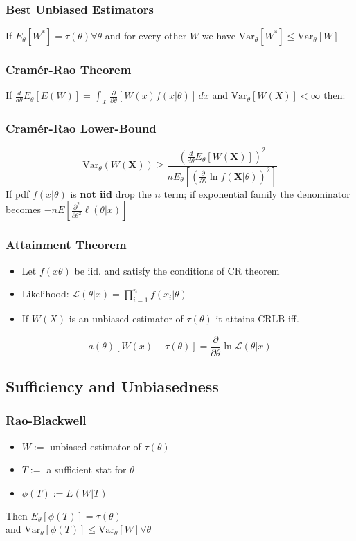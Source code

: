 		\subsubsection{Best Unbiased Estimators}
			If \(E_\theta[W^*] = \tau(\theta) \forall\theta\) 
			and for every other \(W\) we have \(\text{Var}_\theta[W^*]\leq\text{Var}_\theta[W]\)
		
		\subsubsection{Cram\'er-Rao Theorem}
			If 
			\(\frac{d}{d\theta}E_\theta[E(W)] = \int_{\mathcal{X}}\frac{\partial}{\partial\theta}\left[W(x)f(x|\theta)\right]\,dx\)
			and
			\(\text{Var}_\theta[W(X)]<\infty\)
			then:
		
		\subsubsection{Cram\'er-Rao Lower-Bound}
			\[\text{Var}_\theta(W(\mathbf{X}))\geq \frac{\left(\frac{d}{d\theta}E_\theta[W(\mathbf{X})]\right)^2}{
				nE_\theta\left[ \left(\frac{\partial}{\partial\theta}\ln f(\mathbf{X}|\theta)\right)^2 \right]}\]
			If pdf \(f(x|\theta)\) is \textbf{not iid} drop the \(n\) term;
			if exponential family the denominator becomes
			\(-nE\left[\frac{\partial^2}{\partial\theta^2} \ell(\theta|x) \right]\)
			
		\subsubsection{Attainment Theorem}
			\begin{itemize}
				\item Let \(f(x\theta)\) be iid. and satisfy the conditions of CR theorem
				\item Likelihood: \(\mathcal{L}(\theta|x) = \prod_{i=1}^nf(x_i|\theta)\)
				\item If \(W(X)\) is an unbiased estimator of \(\tau(\theta)\) it attains CRLB iff.
			\end{itemize}
			\[a(\theta)\left[W(x)-\tau(\theta)\right] = \frac{\partial}{\partial\theta}\ln\mathcal{L}(\theta|x)\]
			
	\subsection{Sufficiency and Unbiasedness}
		\subsubsection{Rao-Blackwell}
			\begin{itemize}
				\item \(W:=\) unbiased estimator of \(\tau(\theta)\)
				\item \(T:=\) a sufficient stat for \(\theta\)
				\item \(\phi(T):=E(W|T)\)
			\end{itemize}
			Then \(E_\theta[\phi(T)] = \tau(\theta)\) \\
			and \(\text{Var}_\theta[\phi(T)] \leq \text{Var}_\theta[W] \forall \theta\)
			
